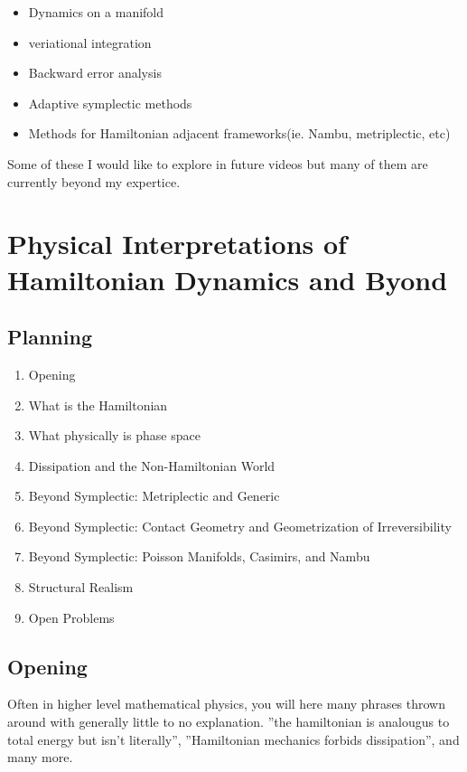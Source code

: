 \begin{itemize}
	\item Dynamics on a manifold
	\item veriational integration
	\item Backward error analysis
	\item Adaptive symplectic methods
	\item Methods for Hamiltonian adjacent frameworks(ie. Nambu, metriplectic, etc)
\end{itemize}

Some of these I would like to explore in future videos but many of them are currently beyond my expertice.

\section{Physical Interpretations of Hamiltonian Dynamics and Byond}

\subsection{Planning}

\begin{enumerate}
	\item Opening
	\item What is the Hamiltonian
	\item What physically is phase space
	\item Dissipation and the Non-Hamiltonian World
	\item Beyond Symplectic: Metriplectic and Generic
	\item Beyond Symplectic: Contact Geometry and Geometrization of Irreversibility
	\item Beyond Symplectic: Poisson Manifolds, Casimirs, and Nambu
	\item Structural Realism
	\item Open Problems
\end{enumerate}

\subsection{Opening}

Often in higher level mathematical physics, you will here many phrases thrown around with generally little to no explanation. ''the hamiltonian is analougus to total energy but isn't literally'', ''Hamiltonian mechanics forbids dissipation'', and many more.

